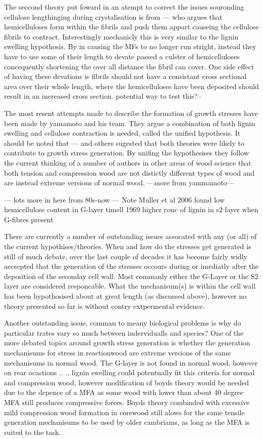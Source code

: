\documentclass{article}
\begin{document}
The seccond theory put foward in an atempt to correct the issues souronding
cellulose lengthinging during crystalisation is from --- who argues that
hemicelluloses form within the fibrils and push them appart causeing the
cellulose fibrils to contract. Interestingly mechanicly this is very similar to
the lignin swelling hypothosis. By in causing the MFs to no longer run stright,
instead they have to use some of their length to devate passed a culster of
hemicelluloses concequently shortening the over all distance the fibril can
cover. One side effect of having these devations is fibrils should not have a
consistant cross sectional area over their whole length, where the
hemicelluloses have been deposited should result in an increased cross section.
potential way to test this?--

The most resent attempts made to describe the formation of growth stresses have
been made by yamamoto and his team. They argue a combination of both lignin
swelling and cellulose contraction is needed, called the unified hypothesis. It
should be noted that --- and others sugested that both theories were likely to
contribute to growth stress generation. By unifing the hypothesises they follow
the current thinking of a number of authors in other areas of wood science that
both tension and compression wood are not distictly different types of wood and
are instead extreme versions of normal wood. ---more from yammamoto---


--- lots more in here from 80s-now ---
Note Muller et al 2006 found low hemicellulose content in G-layer
timell 1969 higher conc of lignin in s2 layer when G-fibres present

There are currently a number of outstanding issues assocated with any (or all)
of the current hypothises/theories. When and how do the stresses get
generated is still of much debate, over the last couple of decades it has become
fairly widly accsepted that the generation of the stresses occours during or
imediatly after the deposition of the seconday cell wall. Most commanly either
the G-Layer or the S2 layer are considered responcable. What the mechanisum(s)
is within the cell wall has been hypothosised about at great length (as
discussed above), however no theory presented so far is without contry
extpermental evidence.

Another outstanding issue, comman to meany biological problems is why do
particular trates vary so much between indervidualls and species? One of the
more debated topics around growth stress generation is whether the generation
mechanisums for stress in reactionwood are extreme versions of the same
mechanisums in normal wood. The G-layer is not found in normal wood, however on
rear ocastions .. .. lignin swelling could potentually fit this criteria for
normal and compression wood, however modification of boyds theory would be
needed due to the depence of a MFA as some wood with lower than about 40 degree
MFA still produces compressive forces. Boyds theory combinded with excessive
mild compression wood formation in corewood still alows for the same tensile
generation mechanisums to be used by older cambriams, as long as the MFA is
suited to the task.
\end{document}
